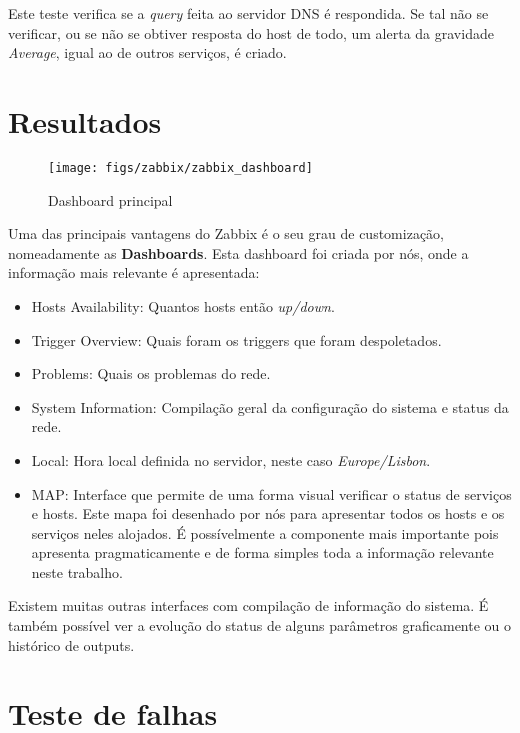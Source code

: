 Este teste verifica se a \textit{query} feita ao servidor DNS é respondida. 
Se tal não se verificar, ou se não se obtiver resposta do host de todo, um alerta da gravidade \textit{Average}, igual ao de outros serviços, é criado.

\pagebreak

\section{Resultados}


\begin{figure}[H]
    \centering
    \texttt{[image: figs/zabbix/zabbix\_dashboard]}
    \caption{Dashboard principal}
    \label{fig:zabbix_dashboard}
\end{figure}

Uma das principais vantagens do Zabbix é o seu grau de customização, nomeadamente as \textbf{Dashboards}.
Esta dashboard foi criada por nós, onde a informação mais relevante é apresentada:
\begin{itemize}
    \item Hosts Availability: Quantos hosts então \textit{up/down}.
    \item Trigger Overview: Quais foram os triggers que foram despoletados.
    \item Problems: Quais os problemas do rede.
    \item System Information: Compilação geral da configuração do sistema e status da rede.
    \item Local: Hora local definida no servidor, neste caso \textit{Europe/Lisbon}.
    \item MAP: Interface que permite de uma forma visual verificar o status de serviços e hosts.
    Este mapa foi desenhado por nós para apresentar todos os hosts e os serviços neles alojados.
    É possívelmente a componente mais importante pois apresenta pragmaticamente e de forma simples toda a informação relevante neste trabalho.
\end{itemize}

Existem muitas outras interfaces com compilação de informação do sistema.
É também possível ver a evolução do status de alguns parâmetros graficamente ou o histórico de outputs.

\pagebreak

\section{Teste de falhas}

